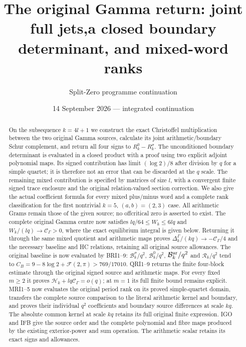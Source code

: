 \documentclass[11pt,a4paper]{article}
\title{The original Gamma return: joint full jets,\newline a closed boundary determinant, and mixed-word ranks}
\author{Split-Zero programme continuation}
\date{14 September 2026 --- integrated continuation}
\begin{document}
\maketitle
\begin{abstract}
On the subsequence $k=4l+1$ we construct the exact Christoffel multiplication between the two original Gamma sources, calculate its joint arithmetic/boundary Schur complement, and return all four signs to $R_k^0-R_k^\sigma$. The unconditioned boundary determinant is evaluated in a closed product with a proof using two explicit adjoint polynomial maps. Its signed contribution has limit $(\log 2)/8$ after division by $q$ for a simple quartet; it is therefore not an error that can be discarded at the $q$ scale. The remaining mixed contribution is specified by matrices of size $l$, with a convergent finite signed trace enclosure and the original relation-valued section correction. We also give the actual coefficient formula for every mixed plus/minus word and a complete rank classification for the first nontrivial $k=5$, $(a,b)=(2,3)$ case. All arithmetic Grams remain those of the given source; no offcritical zero is asserted to exist.
The complete original Gamma centre now satisfies
$lq/64\leq W_k\leq6lq$ and $W_k/(lq)\to\mathcal C_\Gamma>0$,
where the exact equilibrium integral is given below. Returning it
through the same mixed quotient and arithmetic maps proves
$\Delta_k^\Gamma/(kq)\to-\mathcal C_\Gamma/4$ and the necessary
baseline and HC relations, retaining all original source allowances.
The original baseline is now evaluated by BRI1--9:
$\mathcal B_k^\sigma/q^2$, $\mathcal B_k^0/q^2$,
$\mathcal B_k^{\rm ar}/q^2$ and $\mathcal R_k/q^2$ tend to
$C_B=9-8\log2+\mathcal F(2,\pi)>769/17010$.
QRI1--9 returns the finite four-block estimate through the original
signed source and arithmetic maps. For every fixed $m\ge2$ it proves
$\mathcal H_k+lq\mathcal C_\Gamma=o(q)$; at $m=1$ its full finite
bound remains explicit. MRI1--5 now evaluates the original period
rank on its proved simple-quartet domain, transfers the complete
source comparison to the literal arithmetic kernel and boundary,
and proves their individual $q^2$ coefficients and boundary
source differences at scale $kq$. The absolute common kernel
at scale $kq$ retains its full original finite expression.
IGO and IFB give the source order and the complete polynomial and
fibre maps produced by the existing exterior-power and sum operation.
The arithmetic scalar retains its exact signs and allowances.
\end{abstract}
\end{document}
